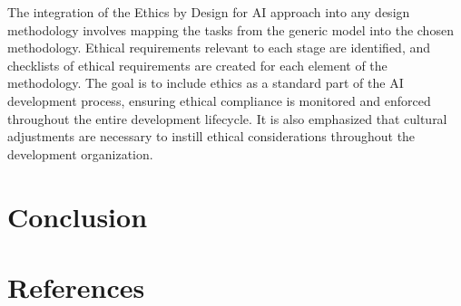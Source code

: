 \documentclass{article}
\begin{document}
The integration of the Ethics by Design for AI approach into any design methodology involves mapping the tasks from the generic model into the chosen methodology. Ethical requirements relevant to each stage are identified, and checklists of ethical requirements are created for each element of the methodology. The goal is to include ethics as a standard part of the AI development process, ensuring ethical compliance is monitored and enforced throughout the entire development lifecycle. It is also emphasized that cultural adjustments are necessary to instill ethical considerations throughout the development organization.

\newpage
\section{Conclusion}

\newpage
\section{References}
\end{document}
